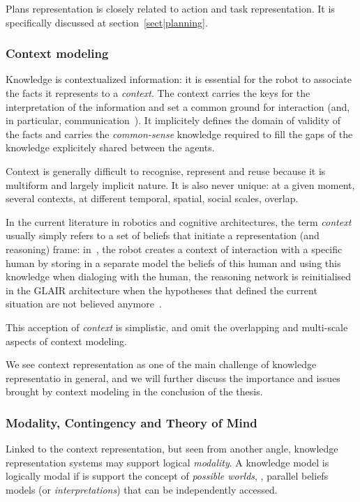 Plans representation is closely related to action and task representation. It
is specifically discussed at section~\ref{sect|planning}.

\subsubsection{Context modeling}

Knowledge is contextualized information: it is essential for the robot to
associate the facts it represents to a \emph{context}. The context carries the
keys for the interpretation of the information and set a common ground for
interaction (and, in particular, communication~\cite{Jakobson1960}). It
implicitely defines the domain of validity of the facts and carries the
\emph{common-sense} knowledge required to fill the gaps of the knowledge
explicitely shared between the agents.

Context is generally difficult to recognise, represent and reuse because it is
multiform and largely implicit nature. It is also never unique: at a given
moment, several contexts, at different temporal, spatial, social scales,
overlap.

In the current literature in robotics and cognitive architectures, the term
\emph{context} usually simply refers to a set of beliefs that initiate a
representation (and reasoning) frame: in~\cite{Lemaignan2011a}, the robot
creates a context of interaction with a specific human by storing in a separate
model the beliefs of this human and using this knowledge when dialoging with
the human, the reasoning network is reinitialised in the GLAIR architecture
when the hypotheses that defined the current situation are not believed
anymore~\cite{Shapiro2009}.

This acception of \emph{context} is simplistic, and omit the overlapping and
multi-scale aspects of context modeling.

We see context representation as one of the main challenge of knowledge
representatio in general, and we will further discuss the importance and issues
brought by context modeling in the conclusion of the thesis.

\subsubsection{Modality, Contingency and Theory of Mind}
\label{sect|possible-worlds}

Linked to the context representation, but seen from another angle, knowledge
representation systems may support logical \emph{modality}. A knowledge model
is logically modal if is support the concept of \emph{possible worlds}, \ie,
parallel beliefs models (or \emph{interpretations}) that can be independently
accessed.

